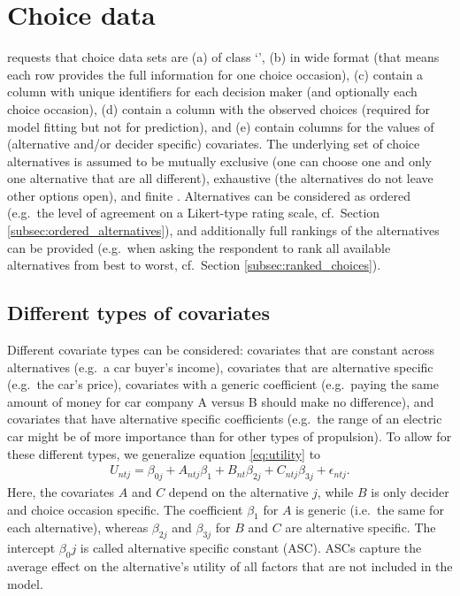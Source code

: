 \documentclass[article,shortnames]{jss}
\newcommand{\class}[1]{`\code{#1}'}
\begin{document}
\section{Choice data} \label{sec:choice_data}

 requests that choice data sets are (a) of class \class{data.frame}, (b) in wide format (that means each row provides the full information for one choice occasion), (c) contain a column with unique identifiers for each decision maker (and optionally each choice occasion), (d) contain a column with the observed choices (required for model fitting but not for prediction), and (e) contain columns for the values of (alternative and/or decider specific) covariates. The underlying set of choice alternatives is assumed to be mutually exclusive (one can choose one and only one alternative that are all different), exhaustive (the alternatives do not leave other options open), and finite \citep[Ch.\ 2]{Train:2009}. Alternatives can be considered as ordered (e.g.\ the level of agreement on a Likert-type rating scale, cf.\ Section \ref{subsec:ordered_alternatives}), and additionally full rankings of the alternatives can be provided (e.g.\ when asking the respondent to rank all available alternatives from best to worst, cf.\ Section \ref{subsec:ranked_choices}).

\subsection{Different types of covariates} \label{subsec:covariate_types}

Different covariate types can be considered: covariates that are constant across alternatives (e.g.\ a car buyer's income), covariates that are alternative specific (e.g.\ the car's price), covariates with a generic coefficient (e.g.\ paying the same amount of money for car company A versus B should make no difference), and covariates that have alternative specific coefficients (e.g.\ the range of an electric car might be of more importance than for other types of propulsion). To allow for these different types, we generalize equation \eqref{eq:utility} to
\begin{align}
  \label{eq:utility_gen}
  U_{ntj} = \beta_{0j} + A_{ntj} \beta_1 + B_{nt} \beta_{2j} + C_{ntj} \beta_{3j} + \epsilon_{ntj}.
\end{align}
Here, the covariates $A$ and $C$ depend on the alternative $j$, while $B$ is only decider and choice occasion specific. The coefficient $\beta_1$ for $A$ is generic (i.e.\ the same for each alternative), whereas $\beta_{2j}$ and $\beta_{3j}$ for $B$ and $C$ are alternative specific. The intercept $\beta_0j$ is called alternative specific constant (ASC). ASCs capture the average effect on the alternative's utility of all factors that are not included in the model.
\end{document}
